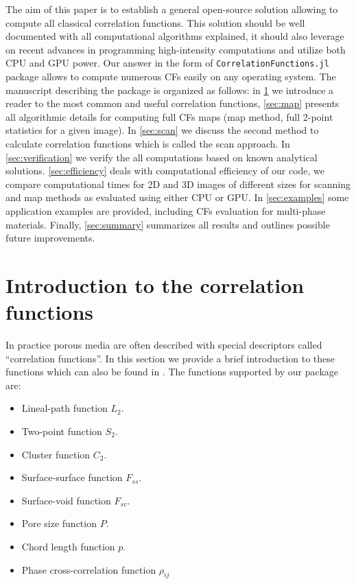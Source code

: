\documentclass[reprint,amsmath,amssymb,aps,pre,showkeys,showpacs,nofootinbib]{revtex4-1}
\newcommand{\code}[1]{\colorbox{light-gray}{\texttt{#1}}}
\begin{document}
The aim of this paper is to establish a general open-source solution allowing to
compute all classical correlation functions. This solution should be well
documented with all computational algorithms explained, it should also leverage
on recent advances in programming high-intensity computations and utilize both
CPU and GPU power. Our answer in the form of \code{CorrelationFunctions.jl}
package allows to compute numerous CFs easily on any operating system. The
manuscript describing the package is organized as follows: in \cref{sec:math} we
introduce a reader to the most common and useful correlation functions,
\cref{sec:map} presents all algorithmic details for computing full CFs maps (map
method, full 2-point statistics for a given image). In \cref{sec:scan} we
discuss the second method to calculate correlation functions which is called the
scan approach. In \cref{sec:verification} we verify the all computations based on
known analytical solutions. \cref{sec:efficiency} deals with computational
efficiency of our code, we compare computational times for 2D and 3D images of
different sizes for scanning and map methods as evaluated using either CPU or
GPU. In \cref{sec:examples} some application examples are provided, including
CFs evaluation for multi-phase materials. Finally, \cref{sec:summary} summarizes
all results and outlines possible future improvements.

\section{Introduction to the correlation functions}
\label{sec:math}
In practice porous media are often described with special descriptors called
``correlation functions''. In this section we provide a brief introduction to
these functions which can also be found in \cite{Torquato_book}. The functions
supported by our package are:
\begin{itemize}
\item Lineal-path function $L_2$.
\item Two-point function $S_2$.
\item Cluster function $C_2$.
\item Surface-surface function $F_{ss}$.
\item Surface-void function $F_{sv}$.
\item Pore size function $P$.
\item Chord length function $p$.
\item Phase cross-correlation function $\rho_{ij}$
\end{itemize}
\end{document}
